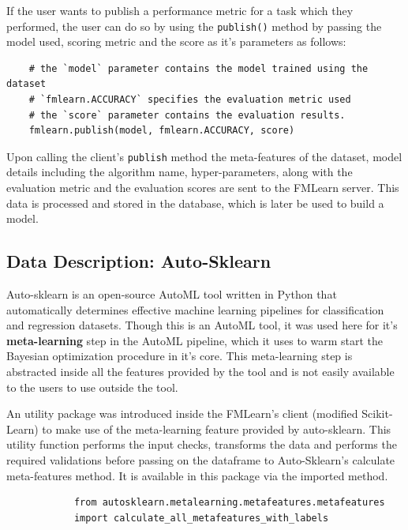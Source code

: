 If the user wants to publish a performance metric for a task which they performed, the user can do so by using the \texttt{publish()} method by passing the model used, scoring metric and the score as it's parameters as follows:

\begin{lstlisting}
    # the `model` parameter contains the model trained using the dataset
    # `fmlearn.ACCURACY` specifies the evaluation metric used
    # the `score` parameter contains the evaluation results.
    fmlearn.publish(model, fmlearn.ACCURACY, score)
\end{lstlisting}

Upon calling the client's \texttt{publish} method the meta-features of the dataset, model details including the algorithm name, hyper-parameters, along with the evaluation metric and the evaluation scores are sent to the FMLearn server. This data is processed and stored in the database, which is later be used to build a model.

\subsection{Data Description: Auto-Sklearn}
\label{auto-sklearn}

Auto-sklearn \citep{feurer:m} is an open-source AutoML tool written in Python that automatically determines effective machine learning pipelines for classification and regression datasets. Though this is an AutoML tool, it was used here for it's \textbf{meta-learning} step in the AutoML pipeline, which it uses to warm start the Bayesian optimization procedure in it's core. This meta-learning step is abstracted inside all the features provided by the tool and is not easily available to the users to use outside the tool.

An utility package was introduced inside the FMLearn's client (modified Scikit-Learn) to make use of the meta-learning feature provided by auto-sklearn. This utility function performs the input checks, transforms the data and performs the required validations before passing on the dataframe to Auto-Sklearn's calculate meta-features method. It is available in this package via the imported method.

\begin{lstlisting}
            from autosklearn.metalearning.metafeatures.metafeatures 
            import calculate_all_metafeatures_with_labels
\end{lstlisting}

